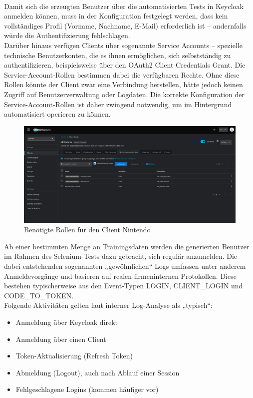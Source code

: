 \documentclass[a4paper,12pt]{article}
\begin{document}
	\\[0.5em]
	Damit sich die erzeugten Benutzer über die automatisierten Tests in Keycloak anmelden können, muss in der Konfiguration festgelegt werden, dass kein vollständiges Profil (Vorname, Nachname, E-Mail) erforderlich ist – andernfalls würde die Authentifizierung fehlschlagen.
	\\[0.5em]
	Darüber hinaus verfügen Clients über sogenannte Service Accounts – spezielle technische Benutzerkonten, die es ihnen ermöglichen, sich selbstständig zu authentifizieren, beispielsweise über den OAuth2 Client Credentials Grant. Die Service-Account-Rollen bestimmen dabei die verfügbaren Rechte. Ohne diese Rollen könnte der Client zwar eine Verbindung herstellen, hätte jedoch keinen Zugriff auf Benutzerverwaltung oder Logdaten. Die korrekte Konfiguration der Service-Account-Rollen ist daher zwingend notwendig, um im Hintergrund automatisiert operieren zu können.
	\\[0.5em]
	\begin{figure}[H]
		\centering
		\includegraphics[width=0.9\linewidth]{screenshot012}
		\caption{Benötigte Rollen für den Client Nintendo}
		\label{fig:screenshot012}
	\end{figure}
	Ab einer bestimmten Menge an Trainingsdaten werden die generierten Benutzer im Rahmen des Selenium-Tests dazu gebracht, sich regulär anzumelden. Die dabei entstehenden sogenannten „gewöhnlichen“ Logs umfassen unter anderem Anmeldevorgänge und basieren auf realen firmeninternen Protokollen. Diese bestehen typischerweise aus den Event-Typen LOGIN, CLIENT\_LOGIN und CODE\_TO\_TOKEN.
	\\[0.5em]
	Folgende Aktivitäten gelten laut interner Log-Analyse als „typisch“:
	
	\begin{itemize}
		\item Anmeldung über Keycloak direkt
		\item Anmeldung über einen Client
		\item Token-Aktualisierung (Refresh Token)
		\item Abmeldung (Logout), auch nach Ablauf einer Session
		\item Fehlgeschlagene Logins (kommen häufiger vor)
	\end{itemize}
	
\end{document}
